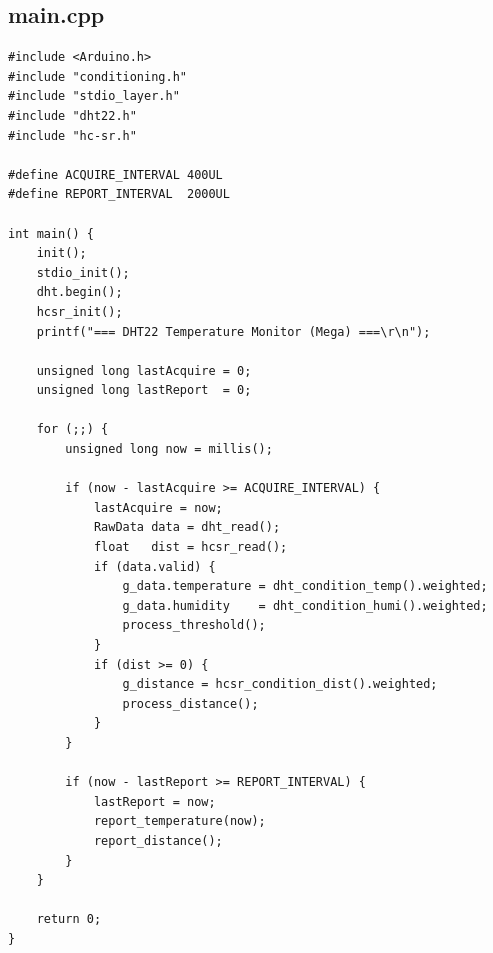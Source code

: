 \documentclass[12pt,a4paper]{article}
\begin{document}
\subsection{main.cpp}
\begin{lstlisting}
#include <Arduino.h>
#include "conditioning.h"
#include "stdio_layer.h"
#include "dht22.h"
#include "hc-sr.h"

#define ACQUIRE_INTERVAL 400UL
#define REPORT_INTERVAL  2000UL

int main() {
    init();
    stdio_init();
    dht.begin();
    hcsr_init();
    printf("=== DHT22 Temperature Monitor (Mega) ===\r\n");

    unsigned long lastAcquire = 0;
    unsigned long lastReport  = 0;

    for (;;) {
        unsigned long now = millis();

        if (now - lastAcquire >= ACQUIRE_INTERVAL) {
            lastAcquire = now;
            RawData data = dht_read();
            float   dist = hcsr_read();
            if (data.valid) {
                g_data.temperature = dht_condition_temp().weighted;
                g_data.humidity    = dht_condition_humi().weighted;
                process_threshold();
            }
            if (dist >= 0) {
                g_distance = hcsr_condition_dist().weighted;
                process_distance();
            }
        }

        if (now - lastReport >= REPORT_INTERVAL) {
            lastReport = now;
            report_temperature(now);
            report_distance();
        }
    }

    return 0;
}
\end{lstlisting}
\end{document}
